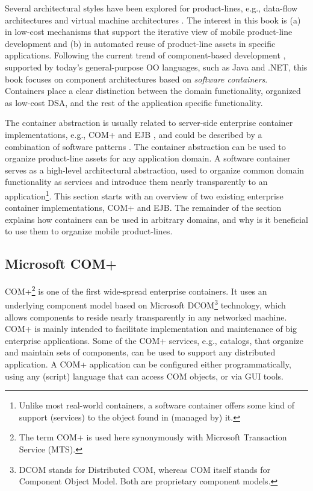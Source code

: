 Several architectural styles \cite{harsu.2001} have been explored for product-lines, e.g., data-flow architectures and virtual machine architectures \cite{harsu.2001}. The interest in this book is (a) in low-cost mechanisms that support the iterative view of mobile product-line development and (b) in automated reuse of product-line assets in specific applications. Following the current trend of component-based development \cite{comp.soft.book}, supported by today's general-purpose OO languages, such as Java and .NET, this book focuses on component architectures \cite{otm,comp.soft.book,comp.soft.book2,assmann.99-comparison} based on \textit{software containers}. Containers place a clear distinction between the domain functionality, organized as low-cost DSA, and the rest of the application specific functionality. %

The container abstraction is usually related to server-side enterprise container implementations, e.g., COM+ \cite{comp.services} and EJB \cite{j2ee14}, and could be described by a combination of software patterns \cite{server.patterns.02}. The container abstraction can be used to organize product-line assets for any application domain. A software container serves as a high-level architectural abstraction, used to organize common domain functionality as services and introduce them nearly transparently to an application\footnote{Unlike most real-world containers, a software container offers some kind of support (services) to the object found in (managed by) it.}. This section starts with an overview of two existing enterprise container implementations, COM+ and EJB. The remainder of the section explains how containers can be used in arbitrary domains, and why is it beneficial to use them to organize mobile product-lines.

\subsection{Microsoft COM+}

COM+\footnote{The term COM+ is used here synonymously with Microsoft Transaction Service (MTS).} \cite{comp.services,www.comp} is one of the first wide-spread enterprise containers. It uses an underlying component model based on Microsoft DCOM\footnote{DCOM stands for Distributed COM, whereas COM itself stands for Component Object Model. Both are proprietary component models.} \cite{www.dcom} technology, which allows components to reside nearly transparently in any networked machine. COM+ is mainly intended to facilitate implementation and maintenance of big enterprise applications. Some of the COM+ services, e.g., catalogs, that organize and maintain sets of components, can be used to support any distributed application. A COM+ application can be configured either programmatically, using any (script) language that can access COM objects, or via GUI tools.

